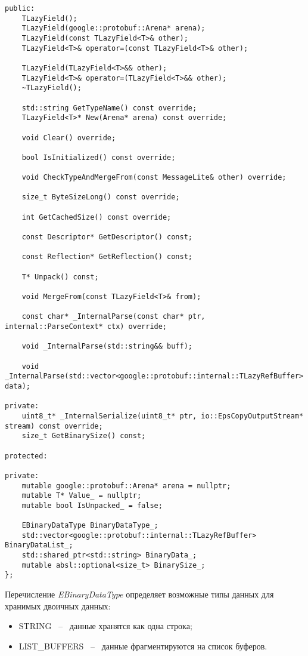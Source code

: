 \begin{lstlisting}[style=CodeListing]
public:
    TLazyField();
    TLazyField(google::protobuf::Arena* arena);
    TLazyField(const TLazyField<T>& other);
    TLazyField<T>& operator=(const TLazyField<T>& other);

    TLazyField(TLazyField<T>&& other);
    TLazyField<T>& operator=(TLazyField<T>&& other);
    ~TLazyField();

    std::string GetTypeName() const override;
    TLazyField<T>* New(Arena* arena) const override;

    void Clear() override;

    bool IsInitialized() const override;

    void CheckTypeAndMergeFrom(const MessageLite& other) override;

    size_t ByteSizeLong() const override;

    int GetCachedSize() const override;

    const Descriptor* GetDescriptor() const;

    const Reflection* GetReflection() const;

    T* Unpack() const;

    void MergeFrom(const TLazyField<T>& from);

    const char* _InternalParse(const char* ptr, internal::ParseContext* ctx) override;

    void _InternalParse(std::string&& buff);

    void _InternalParse(std::vector<google::protobuf::internal::TLazyRefBuffer> data);

private:
    uint8_t* _InternalSerialize(uint8_t* ptr, io::EpsCopyOutputStream* stream) const override;
    size_t GetBinarySize() const;

protected:

private:
    mutable google::protobuf::Arena* arena = nullptr;
    mutable T* Value_ = nullptr;
    mutable bool IsUnpacked_ = false;

    EBinaryDataType BinaryDataType_;
    std::vector<google::protobuf::internal::TLazyRefBuffer> BinaryDataList_;
    std::shared_ptr<std::string> BinaryData_;
    mutable absl::optional<size_t> BinarySize_;
};

\end{lstlisting}

Перечисление \textit{EBinaryDataType} определяет возможные типы данных для хранимых двоичных данных:
\begin{itemize}
    \item STRING ~--~ данные хранятся как одна строка;
    \item LIST\_BUFFERS ~--~ данные фрагментируются на список буферов.
\end{itemize}

